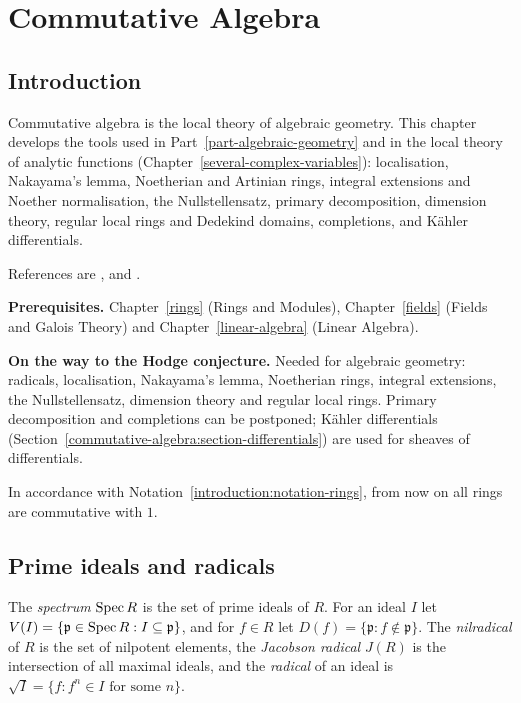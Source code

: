 \chapter{Commutative Algebra}\label{commutative-algebra}

\section{Introduction}\label{commutative-algebra:section-introduction}

Commutative algebra is the local theory of algebraic geometry. This chapter develops the tools used in
Part~\ref{part-algebraic-geometry} and in the local theory of analytic functions
(Chapter~\ref{several-complex-variables}): localisation, Nakayama's lemma, Noetherian and Artinian rings,
integral extensions and Noether normalisation, the Nullstellensatz, primary decomposition, dimension theory,
regular local rings and Dedekind domains, completions, and K\"ahler differentials.

References are \cite{atiyah-macdonald}, \cite{matsumura-crt} and \cite{eisenbud-ca}.

\noindent\textbf{Prerequisites.} Chapter~\ref{rings} (Rings and Modules), Chapter~\ref{fields} (Fields and
Galois Theory) and Chapter~\ref{linear-algebra} (Linear Algebra).

\noindent\textbf{On the way to the Hodge conjecture.} Needed for algebraic geometry: radicals, localisation, Nakayama's lemma, Noetherian rings, integral extensions, the Nullstellensatz, dimension
theory and regular local rings. Primary decomposition and completions can be postponed; K\"ahler differentials (Section~\ref{commutative-algebra:section-differentials}) are used for sheaves of differentials.

In accordance with Notation~\ref{introduction:notation-rings}, from now on all rings are commutative with $1$.

\section{Prime ideals and radicals}\label{commutative-algebra:section-radicals}

\begin{definition}\label{commutative-algebra:definition-spectrum}
The \emph{spectrum} $\operatorname{Spec} R$ is the set of prime ideals of $R$. For an ideal $I$ let
$V(I) = \{\mathfrak{p} \in \operatorname{Spec} R : I \subseteq \mathfrak{p}\}$, and for $f \in R$ let
$D(f) = \{\mathfrak{p} : f \notin \mathfrak{p}\}$. The \emph{nilradical} of $R$ is the set of nilpotent elements, the
\emph{Jacobson radical} $J(R)$ is the intersection of all maximal ideals, and the \emph{radical} of an ideal is
$\sqrt I = \{f : f^n \in I \text{ for some } n\}$.
\end{definition}

